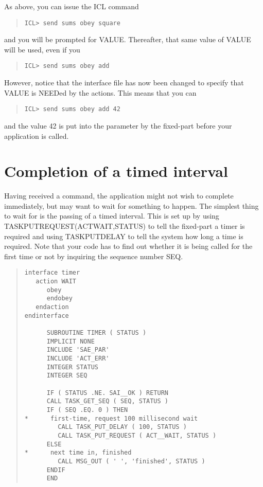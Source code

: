 \documentclass[twoside,11pt]{article}
\newcommand{\xlabel}[1]{}
\renewcommand{\_}{\texttt{\symbol{95}}}
\begin{document}
As above, you can issue the ICL command

\small \begin{quote} \begin{verbatim}
ICL> send sums obey square
\end{verbatim} \end{quote} \normalsize

and you will be prompted for VALUE. Thereafter, that same value of VALUE
will be used, even if you

\small \begin{quote} \begin{verbatim}
ICL> send sums obey add
\end{verbatim} \end{quote} \normalsize

However, notice that the interface file has now been changed to specify that
VALUE is NEEDed by the actions. This means that you can

\small \begin{quote} \begin{verbatim}
ICL> send sums obey add 42
\end{verbatim} \end{quote} \normalsize

and the value 42 is put into the parameter by the fixed-part before your
application is called.

\section{Completion of a timed interval\xlabel{completion_of_a_timed_interval}}

Having received a command, the application might not wish to complete
immediately, but may want to wait for something to happen. The simplest
thing to wait for is the passing of a timed interval. This is set up by
using TASK\_PUT\_REQUEST(ACT\_\_WAIT,STATUS) to tell the fixed-part a
timer is required and using TASK\_PUT\_DELAY to tell the system how long
a time is required. Note that your code has to find out whether it is
being called for the first time or not by inquiring the sequence number
SEQ.

\small \begin{quote} \begin{verbatim}
interface timer
   action WAIT
      obey
      endobey
   endaction
endinterface

      SUBROUTINE TIMER ( STATUS )
      IMPLICIT NONE
      INCLUDE 'SAE_PAR'
      INCLUDE 'ACT_ERR'
      INTEGER STATUS
      INTEGER SEQ

      IF ( STATUS .NE. SAI__OK ) RETURN
      CALL TASK_GET_SEQ ( SEQ, STATUS )
      IF ( SEQ .EQ. 0 ) THEN
*      first-time, request 100 millisecond wait
         CALL TASK_PUT_DELAY ( 100, STATUS )
         CALL TASK_PUT_REQUEST ( ACT__WAIT, STATUS )
      ELSE
*      next time in, finished
         CALL MSG_OUT ( ' ', 'finished', STATUS )
      ENDIF
      END
\end{verbatim} \end{quote} \normalsize
\end{document}
